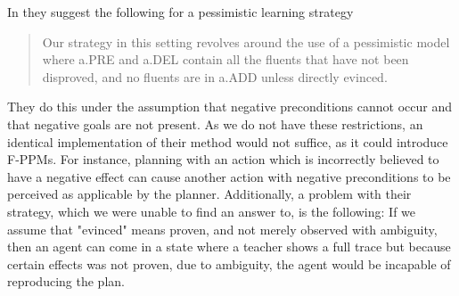 \documentclass[\master/Master.tex]{subfiles}
\begin{document}
	In \cite{Walsh2008} they suggest the following for a pessimistic learning strategy
	
	\begin{quotation}
		Our strategy in
		this setting revolves around the use of a pessimistic model
		where a.PRE and a.DEL contain all the fluents that have
		not been disproved, and no fluents are in a.ADD unless directly
		evinced.
	\end{quotation}
	 
	They do this under the assumption that negative preconditions cannot occur and that negative goals are not present. As we do not have these restrictions, an identical implementation of their method would not suffice, as it could introduce F-PPMs. For instance, planning with an action which is incorrectly believed to have a negative effect can cause another action with negative preconditions to be perceived as applicable by the planner.
	Additionally, a problem with their strategy, which we were unable to find an answer to, is the following: If we assume that "evinced" means proven, and not merely observed with ambiguity, then an agent can come in a state where a teacher shows a full trace but because certain effects was not proven, due to ambiguity, the agent would be incapable of reproducing the plan.
	
\end{document}
